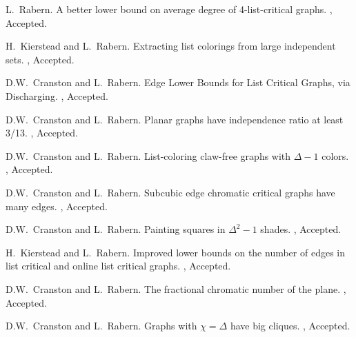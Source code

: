 \documentclass[margin,line]{res}
\begin{document}
\begin{resume}
\begin{enumerate}[{[}1{]}]

\item
L.~Rabern.
\newblock A better lower bound on average degree of 4-list-critical graphs.
, Accepted.
	
	\smallskip
	
	\item
H.~Kierstead and L.~Rabern.
\newblock Extracting list colorings from large independent sets.
, Accepted.

\smallskip

	\item
	D.W.~Cranston and L.~Rabern.
	\newblock Edge Lower Bounds for List Critical Graphs, via Discharging.
	, Accepted.
	\smallskip

\item
D.W.~Cranston and L.~Rabern.
\newblock Planar graphs have independence ratio at least 3/13.
, Accepted.
\smallskip

\item
D.W.~Cranston and L.~Rabern.
\newblock List-coloring claw-free graphs with $\Delta - 1$ colors.
, Accepted.
\smallskip

\item
D.W.~Cranston and L.~Rabern.
\newblock Subcubic edge chromatic critical graphs have many edges.
, Accepted.
\smallskip

\item
D.W.~Cranston and L.~Rabern.
\newblock Painting squares in $\Delta^2 - 1$ shades.
, Accepted.
	
	\smallskip
	
	\item
H.~Kierstead and L.~Rabern.
\newblock Improved lower bounds on the number of edges in list critical and online list critical graphs.
, Accepted.

\smallskip
	
	\item
	D.W.~Cranston and L.~Rabern.
	\newblock The fractional chromatic number of the plane.
	, Accepted.
	\smallskip
	
	\item
	D.W.~Cranston and L.~Rabern.
	\newblock Graphs with $\chi = \Delta$ have big cliques.
	, Accepted.
	\smallskip
	

\end{enumerate}
\end{resume}
\end{document}
